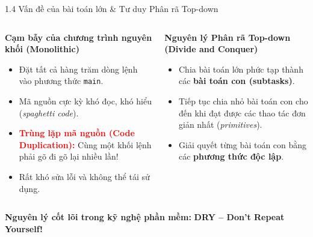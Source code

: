 \documentclass[aspectratio=169, 10pt]{beamer}
\begin{document}
\begin{frame}{1.4 Vấn đề của bài toán lớn \& Tư duy Phân rã Top-down}
  \begin{columns}
    \begin{block}{\textbf{Cạm bẫy của chương trình nguyên khối (Monolithic)}}
      \begin{itemize}
        \item Đặt tất cả hàng trăm dòng lệnh vào phương thức \texttt{main}.
        \item Mã nguồn cực kỳ khó đọc, khó hiểu (\textit{spaghetti code}).
        \item \textcolor{red}{\textbf{Trùng lặp mã nguồn (Code Duplication):}} Cùng một khối lệnh phải gõ đi gõ lại nhiều lần!
        \item Rất khó sửa lỗi và không thể tái sử dụng.
      \end{itemize}
    \end{block}

    \begin{block}{\textbf{Nguyên lý Phân rã Top-down (Divide and Conquer)}}
      \begin{itemize}
        \item Chia bài toán lớn phức tạp thành các \textbf{bài toán con (subtasks)}.
        \item Tiếp tục chia nhỏ bài toán con cho đến khi đạt được các thao tác đơn giản nhất (\textit{primitives}).
        \item Giải quyết từng bài toán con bằng các \textbf{phương thức độc lập}.
      \end{itemize}
    \end{block}
  \end{columns}

  \vspace{2mm}
  \begin{center}
    \textbf{Nguyên lý cốt lõi trong kỹ nghệ phần mềm:} \textbf{DRY -- Don't Repeat Yourself!}
  \end{center}
\end{frame}
\end{document}
